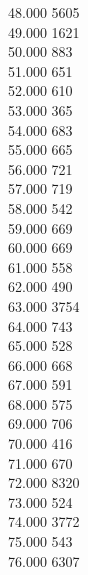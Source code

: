 { 48.000	5605 \\
 49.000	1621 \\
 50.000	883 \\
 51.000	651 \\
 52.000	610 \\
 53.000	365 \\
 54.000	683 \\
 55.000	665 \\
 56.000	721 \\
 57.000	719 \\
 58.000	542 \\
 59.000	669 \\
 60.000	669 \\
 61.000	558 \\
 62.000	490 \\
 63.000	3754 \\
 64.000	743 \\
 65.000	528 \\
 66.000	668 \\
 67.000	591 \\
 68.000	575 \\
 69.000	706 \\
 70.000	416 \\
 71.000	670 \\
 72.000	8320 \\
 73.000	524 \\
 74.000	3772 \\
 75.000	543 \\
 76.000	6307 \\
}
